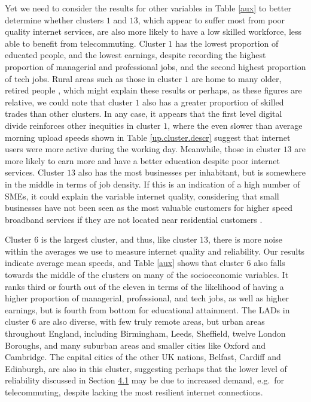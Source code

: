 \documentclass[]{interact}
\theoremstyle{plain}%
\theoremstyle{definition}
\theoremstyle{remark}
\begin{document}
Yet we need to consider the results for other variables in Table
\ref{aux} to better determine whether clusters \(1\) and \(13\), which
appear to suffer most from poor quality internet services, are also more
likely to have a low skilled workforce, less able to benefit from
telecommuting. Cluster \(1\) has the lowest proportion of educated
people, and the lowest earnings, despite recording the highest
proportion of managerial and professional jobs, and the second highest
proportion of tech jobs. Rural areas such as those in cluster \(1\) are
home to many older, retired people \citep{blank2018local}, which might
explain these results or perhaps, as these figures are relative, we
could note that cluster \(1\) also has a greater proportion of skilled
trades than other clusters. In any case, it appears that the first level
digital divide reinforces other inequities in cluster \(1\), where the
even slower than average morning upload speeds shown in Table
\ref{up.cluster.descr} suggest that internet users were more active
during the working day. Meanwhile, those in cluster \(13\) are more
likely to earn more and have a better education despite poor internet
services. Cluster \(13\) also has the most businesses per inhabitant,
but is somewhere in the middle in terms of job density. If this is an
indication of a high number of SMEs, it could explain the variable
internet quality, considering that small businesses have not been seen
as the most valuable customers for higher speed broadband services if
they are not located near residential customers \citep{ofcom2016}.

Cluster \(6\) is the largest cluster, and thus, like cluster \(13\),
there is more noise within the averages we use to measure internet
quality and reliability. Our results indicate average mean speeds, and
Table \ref{aux} shows that cluster \(6\) also falls towards the middle
of the clusters on many of the socioeconomic variables. It ranks third
or fourth out of the eleven in terms of the likelihood of having a
higher proportion of managerial, professional, and tech jobs, as well as
higher earnings, but is fourth from bottom for educational attainment.
The LADs in cluster \(6\) are also diverse, with few truly remote areas,
but urban areas throughout England, including Birmingham, Leeds,
Sheffield, twelve London Boroughs, and many suburban areas and smaller
cities like Oxford and Cambridge. The capital cities of the other UK
nations, Belfast, Cardiff and Edinburgh, are also in this cluster,
suggesting perhaps that the lower level of reliability discussed in
Section \protect\hyperlink{sec:4.1}{4.1} may be due to increased demand,
e.g.~for telecommuting, despite lacking the most resilient internet
connections.
\end{document}
